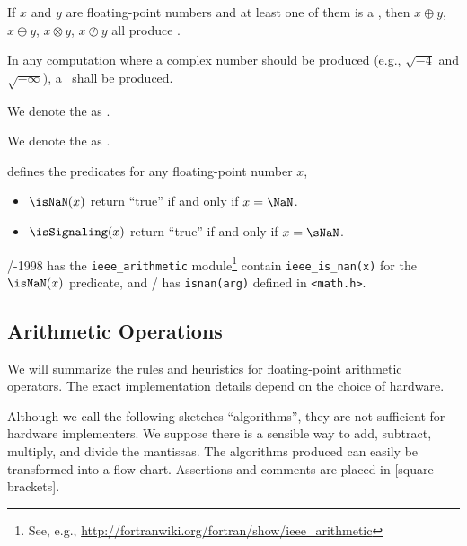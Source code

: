 \begin{axiom}
If $x$ and $y$ are floating-point numbers and at least one of them is a \NaN,
then $x\oplus y$, $x\ominus y$, $x\otimes y$, $x\oslash y$ all produce \NaN.
\end{axiom}

\begin{axiom}
  In any computation where a complex number should be produced (e.g.,
  $\sqrt{-4}$ and $\sqrt{-\infty}$), a \NaN\ shall be produced.
\end{axiom}

\begin{defn}
  We denote the  as \qNaN.
\end{defn}
\begin{defn}
  We denote the  as \sNaN.
\end{defn}
\begin{defn}
   defines the predicates for any floating-point number $x$,
  \begin{itemize}
  \item $\isNaN(x)$ return ``true'' if and only if $x=\NaN$. 
  \item $\isSignaling(x)$ return ``true'' if and only if $x=\sNaN$.
  \end{itemize}
\end{defn}
\begin{rmk}
  \FORTRAN/-1998 has the \verb|ieee_arithmetic| module\footnote{See,
  e.g., \url{http://fortranwiki.org/fortran/show/ieee_arithmetic}}
  contain \verb|ieee_is_nan(x)| for the $\isNaN(x)$
  predicate, and \CEE/ has \verb|isnan(arg)| defined in \verb|<math.h>|.
\end{rmk}


\subsection{Arithmetic Operations}

We will summarize the rules and heuristics for floating-point arithmetic
operators. The exact implementation details depend on the choice of
hardware.

\begin{danger}
  Although we call the following sketches ``algorithms'', they are not
  sufficient for hardware implementers. We suppose there is a sensible
  way to add, subtract, multiply, and divide the mantissas. The
  algorithms produced can easily be transformed into a
  flow-chart. Assertions and comments are placed in [square brackets].
\end{danger}

